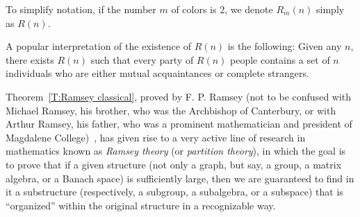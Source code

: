 \begin{notation} 
To simplify notation, if the number $m$ of colors is 2, we denote $R_m(n)$ simply as $R(n)$.
\end{notation}

A popular interpretation of the existence of $R(n)$ is the following: Given any $n$, there exists $R(n)$ such that every party of $R(n)$  people contains a set of $n$ individuals who are either mutual acquaintances  or complete strangers.


Theorem~\ref{T:Ramsey classical}, proved by F. P. Ramsey (not to be confused with Michael Ramsey, his brother, who was the Archbishop of Canterbury, or with Arthur Ramsey, his father, who was a prominent mathematician and president of Magdalene College)~\cite{Ramsey:1929}, has given rise to a very active line of research in mathematics known as \emph{Ramsey theory} (or \emph{partition theory}), in which the goal is to prove that if a given structure (not only a graph, but say, a group, a matrix algebra, or a Banach space) is sufficiently large, then we are guaranteed to find in it a substructure (respectively, a subgroup, a subalgebra, or a subspace)  that is ``organized'' within the original structure in a recognizable way. 

